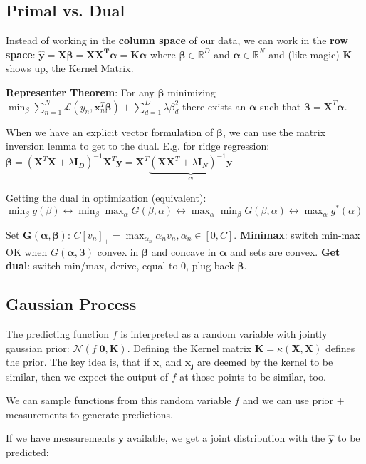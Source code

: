 \documentclass[10pt,a4paper,landscape]{article}
\renewcommand{\bf}[1]{\ensuremath{\mathbf{#1}}}
\newcommand{\balpha}{\boldsymbol\alpha}
\newcommand{\bbeta}{\boldsymbol\beta}
\begin{document}
\begin{multicols*}{4}
\subsection{Primal vs. Dual}
Instead of working in the \textbf{column space} of our data, we can work in the \textbf{row space}:
$\bf{\hat{y} = X \bbeta = X X^T \balpha = K \balpha}$
where $\bbeta \in \mathbb{R}^D$ and $\balpha \in \mathbb{R}^N$
and (like magic) $\bf{K}$ shows up, the Kernel Matrix.

\textbf{Representer Theorem}: For any $\bbeta$ minimizing
$\min_\beta \sum_{n=1}^N \mathcal{L}(y_n, \bf{x}_n^T \bbeta) + \sum_{d=1}^D \lambda \beta_d^2$
there exists an $\balpha$ such that $\bbeta = \bf{X}^T \balpha$.

When we have an explicit vector formulation of $\bbeta$, we can use the matrix inversion lemma to get to the dual. E.g. for ridge regression:
$\bbeta = (\bf{X}^T \bf{X}  + \lambda \bf{I}_D)^{-1} \bf{X}^T \bf{y}= \bf{X}^T \underbrace{(\bf{X X}^T + \lambda \bf{I}_N)^{-1} \bf{y}}_{\balpha}$

Getting the dual in optimization (equivalent):
$\min_{\beta} g(\beta) \leftrightarrow 
\min_{\beta} \max_{\alpha} G(\beta, \alpha) \leftrightarrow 
\max_{\alpha} \min_{\beta} G(\beta, \alpha) \leftrightarrow 
\max_{\alpha} g^*(\alpha)$

Set $\bf{G}(\balpha, \bbeta)$: $C[v_n]_+ = \max_{\alpha_n} \alpha_n v_n, \alpha_n \in [0, C]$.
\textbf{Minimax}: switch min-max OK when $G(\balpha, \bbeta)$ convex in $\bbeta$ and concave in $\balpha$ and sets are convex.
\textbf{Get dual}: switch min/max, derive, equal to 0, plug back $\bbeta$.

\subsection{Gaussian Process}
The predicting function $f$ is interpreted as a random variable with jointly gaussian prior: $\mathcal{N}(f | \bf{0}, \bf{K})$.
Defining the Kernel matrix $\bf{K} = \kappa(\bf{X}, \bf{X})$ defines the prior. The key idea is, that if $\bf{x}_i$ and $\bf{x_j}$ are
deemed by the kernel to be similar, then we expect the output of $f$ at those points to be similar, too.

We can sample functions from this random variable $f$ and we can use prior + measurements to generate predictions.

If we have measurements $\bf{y}$ available, we get a joint distribution with the $\bf{\hat{y}}$ to be predicted:


\end{multicols*}
\end{document}
